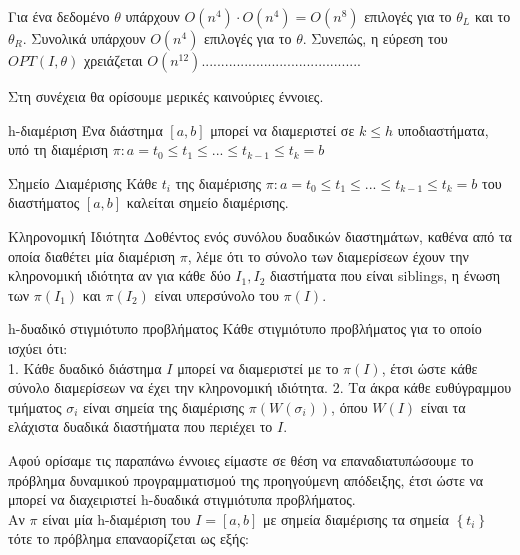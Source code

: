 \documentclass[oneside,12pt]{book}
\theoremstyle{definition}
\begin{document}
Για ένα δεδομένο \(θ\) υπάρχουν \(O(n^4) \cdot O(n^4) = O(n^8)\) επιλογές για το \(θ_L\) και το \(θ_R\). Συνολικά υπάρχουν \(O(n^4)\) επιλογές για το \(θ\). Συνεπώς, η εύρεση του \(OPT(I,θ)\) χρειάζεται \(Ο(n^{12})\).........................................

Στη συνέχεια θα ορίσουμε μερικές καινούριες έννοιες. \\

\begin{mydefinition}{h-διαμέριση}{}
	Ένα διάστημα \([a,b]\) μπορεί να διαμεριστεί σε \(k \leq h\) υποδιαστήματα, υπό τη διαμέριση \(π: a = t_0 \leq t_1 \leq ... \leq t_{k-1} \leq t_k = b\)
\end{mydefinition}

\begin{mydefinition}{Σημείο Διαμέρισης}{}
	Κάθε \(t_i\) της διαμέρισης \(π: a = t_0 \leq t_1 \leq ... \leq t_{k-1} \leq t_k = b\) του διαστήματος \([a,b]\) καλείται σημείο διαμέρισης.
\end{mydefinition}

\begin{mydefinition}{Κληρονομική Ιδιότητα}{}
	Δοθέντος ενός συνόλου δυαδικών διαστημάτων, καθένα από τα οποία διαθέτει μία διαμέριση \(π\), λέμε ότι το σύνολο των διαμερίσεων έχουν την κληρονομική ιδιότητα αν για κάθε δύο \(I_1, I_2\) διαστήματα που είναι siblings, η ένωση των \(π(I_1)\) και \(π(I_2)\) είναι υπερσύνολο του \(π(Ι)\). 
\end{mydefinition}

\begin{mydefinition}{h-δυαδικό στιγμιότυπο προβλήματος}{}
	Κάθε στιγμιότυπο προβλήματος για το οποίο ισχύει ότι: \\
	1. Κάθε δυαδικό διάστημα \(I\) μπορεί να διαμεριστεί με το \(π(Ι)\), έτσι ώστε κάθε σύνολο διαμερίσεων να έχει την κληρονομική ιδιότητα.
	2. Τα άκρα κάθε ευθύγραμμου τμήματος \(σ_i\) είναι σημεία της διαμέρισης \(π(W(σ_i))\), όπου \(W(I)\) είναι τα ελάχιστα δυαδικά διαστήματα που περιέχει το \(I\). 
\end{mydefinition}

Αφού ορίσαμε τις παραπάνω έννοιες είμαστε σε θέση να επαναδιατυπώσουμε το πρόβλημα δυναμικού προγραμματισμού της προηγούμενη απόδειξης, έτσι ώστε να μπορεί να διαχειριστεί h-δυαδικά στιγμιότυπα προβλήματος. \\

Αν \(π\) είναι μία h-διαμέριση του \(I = [a,b]\) με σημεία διαμέρισης τα σημεία \(\left\{ t_i \right\}\) τότε το πρόβλημα επαναορίζεται ως εξής:
\end{document}
